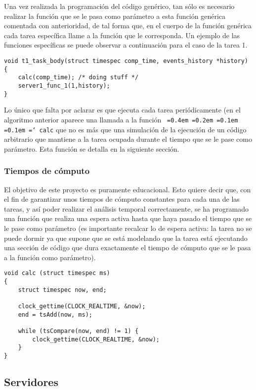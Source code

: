 \documentclass[11pt,spanish]{article}
\newcommand*\justify{%
  \fontdimen2\font=0.4em%
  \fontdimen3\font=0.2em%
  \fontdimen4\font=0.1em%
  \fontdimen7\font=0.1em%
  \hyphenchar\font=`\-%
}
\newcommand{\code}[1]{\texttt{\justify #1}}
\begin{document}
Una vez realizada la programación del código genérico, tan sólo es necesario realizar la
función que se le pasa como parámetro a esta función genérica comentada con anterioridad,
de tal forma que, en el cuerpo de la función genérica cada tarea específica llame a la 
función que le corresponda. Un ejemplo de las funciones específicas se puede observar
a continuación para el caso de la tarea 1.

\begin{lstlisting}[style=c]
void t1_task_body(struct timespec comp_time, events_history *history)
{
    calc(comp_time); /* doing stuff */ 
    server1_func_1(1,history);
}
\end{lstlisting}

Lo único que falta por aclarar es que ejecuta cada tarea periódicamente (en el algoritmo
anterior aparece una llamada a la función \code{calc} que no es más que una simulación
de la ejecución de un código arbitrario que mantiene a la tarea ocupada durante el tiempo
que se le pase como parámetro. Esta función se detalla en la siguiente sección.

\subsubsection{Tiempos de cómputo}
El objetivo de este proyecto es puramente educacional. Esto quiere decir que, con el 
fin de garantizar unos tiempos de cómputo constantes para cada una de las tareas, y así 
poder realizar el análisis temporal correctamente, se ha programado una función que 
realiza una espera activa hasta que haya pasado el tiempo que se le pase
como parámetro (es importante recalcar lo de espera activa: la tarea no se puede dormir
ya que supone que se está modelando que la tarea está ejecutando una sección de código 
que dura exactamente el tiempo de cómputo que se le pasa a la función como parámetro).

\begin{lstlisting}[style=c]
void calc (struct timespec ms) 
{
    struct timespec now, end;

    clock_gettime(CLOCK_REALTIME, &now);   
    end = tsAdd(now, ms);

    while (tsCompare(now, end) != 1) {
        clock_gettime(CLOCK_REALTIME, &now);
    }
}
\end{lstlisting}

\subsection{Servidores}
\end{document}
